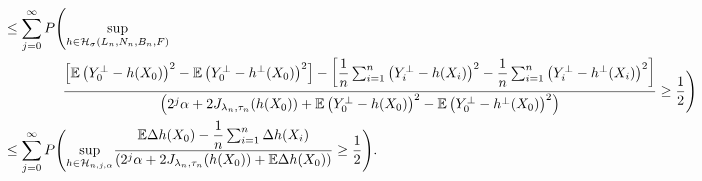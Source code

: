 \documentclass[10pt,twoside]{article}
\numberwithin{equation}{section}
\newcommand{\E}{\ensuremath{\mathbb{E}}}
\begin{document}
\begin{align*}
 \\
\nonumber  & \leq \sum_{j=0}^{\infty} P\Bigg( \underset{h \in \mathcal{H}_ {\sigma}(L_n, N_n, B_n, F)}{\sup} \\ 
& \hspace{1.5cm}  \dfrac{\left[ \E\left(Y_0^ {\bot} - h (X_0) \right) ^2  -  \E \left(Y_0^ {\bot}   - h^ {\bot} (X_0) \right) ^2 \right] 
 - \left[\dfrac{1}{n} \sum_{i=1}^n \left(Y_i^{\bot}  - h (X_i) \right) ^2  -  \dfrac{1}{n} \sum_{i=1}^n \left(Y_i^ {\bot} - h^ {\bot} (X_i) \right) ^2 \right] }{\left(2^j \alpha + 2 J_{\lambda_n, \tau_n}(h (X_0)) + \E \left(Y_0^{\bot} - h (X_0) \right) ^2 -  \E \left(Y_0^{\bot}  - h^ {\bot} (X_0) \right) ^2 \right)}  \ge \dfrac{1}{2}  \Bigg) 
  \\
  & \leq  \sum_{j =0}^{\infty} P\Bigg( \underset{h \in\mathcal{H}_ {n, j, \alpha}}{\sup} \dfrac{\E \Delta h (X_0) - \dfrac{1}{n} \sum_{i=1}^n \Delta h (X_i) }{\left(2^j\alpha + 2 J_{\lambda_n, \tau_n}(h (X_0)) + \E \Delta h (X_0) \right)} 
  \ge \dfrac{1}{2} \Bigg).
 \end{align*} 

 \medskip
\end{document}
